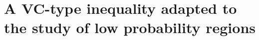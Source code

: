 




\section{A VC-type inequality adapted to the study of low probability regions}
\label{colt:sec:concentration}


